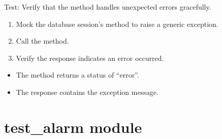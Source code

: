\documentclass[letterpaper,10pt,english]{sphinxmanual}
\begin{document}
\begin{fulllineitems}
\label{\detokenize{test:test.test_admin.test_update_admin_password_unexpected_error}}
\pysigstartsignatures
\pysiglinewithargsret
{}
{\sphinxparamcomma {}}
{}
\pysigstopsignatures
\sphinxAtStartPar
Test: Verify that the method handles unexpected errors gracefully.
\begin{description}
\begin{enumerate}
%
\item {} 
\sphinxAtStartPar
Mock the database session’s  method to raise a generic exception.

\item {} 
\sphinxAtStartPar
Call the  method.

\item {} 
\sphinxAtStartPar
Verify the response indicates an error occurred.

\end{enumerate}

\begin{itemize}
\item {} 
\sphinxAtStartPar
The method returns a status of “error”.

\item {} 
\sphinxAtStartPar
The response contains the exception message.

\end{itemize}

\end{description}

\end{fulllineitems}



\section{test\_alarm module}
\label{\detokenize{test:module-test.test_alarm}}\label{\detokenize{test:test-alarm-module}}
\end{document}
